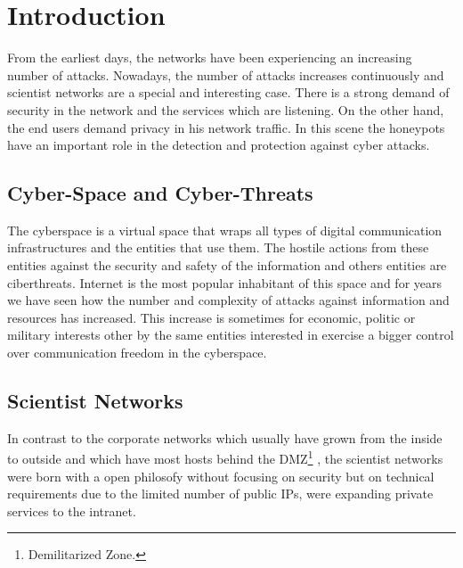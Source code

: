 \documentclass[a4paper]{llncs}
\begin{document}
\section{Introduction}

From the earliest days, %
  the networks have been experiencing an increasing number of
  attacks. Nowadays, %
 the number of attacks increases continuously and scientist networks
 are a special and interesting case. %
 There is a strong demand of security in the network and the services which are listening. On the other hand, the end users demand privacy in his network traffic. In this scene the honeypots have an important role in the detection and protection against cyber attacks.

\subsection{Cyber-Space and Cyber-Threats}
\label{sect:Scientist Networks}

The cyberspace is a virtual space that wraps all types of digital
communication  infrastructures and the entities that use them. The
hostile actions from these entities against the security and safety of
the information and others entities are ciberthreats. Internet is the
most popular inhabitant of this space and for years we have seen how
the number and complexity of attacks against information and resources
has increased. This increase is sometimes for economic, politic or
military interests other by the same entities interested in exercise a
bigger control over communication freedom in the cyberspace.  %


\subsection{Scientist Networks}
\label{sect:Scientist Networks}
In contrast to the corporate networks which usually have grown from
the inside to outside  %
and which have  most hosts  behind the DMZ\footnote{Demilitarized
  Zone.} %
, the scientist networks were born with a open philosofy
 without focusing on security but on technical requirements due to
the limited number of public IPs, were expanding private services to
the intranet.
\end{document}

